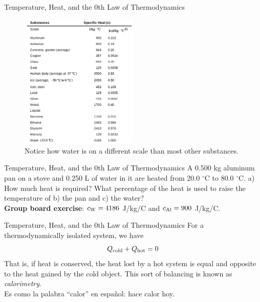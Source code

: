 \documentclass{beamer}
\begin{document}
\begin{frame}{Temperature, Heat, and the 0th Law of Thermodynamics}
\begin{figure}
\centering
\includegraphics[width=0.5\textwidth]{figures/c.png}
\caption{\label{fig:c} Notice how water is on a different scale than most other substances.}
\end{figure}
\end{frame}

\begin{frame}{Temperature, Heat, and the 0th Law of Thermodynamics}
A 0.500 kg aluminum pan on a stove and 0.250 L of water in it are heated from 20.0 $^\circ$C to 80.0 $^\circ$C. a) How much heat is required? What percentage of the heat is used to raise the temperature of b) the pan and c) the water? \\ \vspace{0.5cm}
\textbf{Group board exercise}: $c_{\rm W} = 4186$ J/kg/C and $c_{\rm Al} = 900$ J/kg/C.
\end{frame}

\begin{frame}{Temperature, Heat, and the 0th Law of Thermodynamics}
For a thermodynamically isolated system, we have
\begin{equation}
Q_{\rm cold} + Q_{\rm hot} = 0
\label{eq:calor}
\end{equation}
That is, if heat is conserved, the heat lost by a hot system is equal and opposite to the heat gained by the cold object. This sort of balancing is known as \textit{calorimetry}.  \\ \vspace{0.5cm}
Es como la palabra ``calor'' en espa\~{n}ol: hace calor hoy.
\end{frame}
\end{document}
